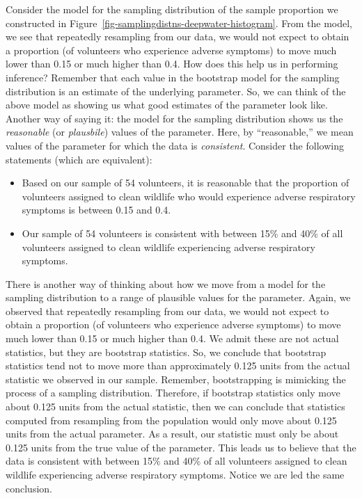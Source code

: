 \documentclass[
  letterpaper,
  DIV=11,
  numbers=noendperiod]{scrreprt}
\providecommand{\tightlist}{%
  \setlength{\itemsep}{0pt}\setlength{\parskip}{0pt}}\usepackage{longtable,booktabs,array}
\theoremstyle{definition}
\theoremstyle{definition}
\theoremstyle{plain}
\theoremstyle{remark}
\begin{document}
Consider the model for the sampling distribution of the sample
proportion we constructed in
Figure~\ref{fig-samplingdistns-deepwater-histogram}. From the model, we
see that repeatedly resampling from our data, we would not expect to
obtain a proportion (of volunteers who experience adverse symptoms) to
move much lower than 0.15 or much higher than 0.4. How does this help us
in performing inference? Remember that each value in the bootstrap model
for the sampling distribution is an estimate of the underlying
parameter. So, we can think of the above model as showing us what good
estimates of the parameter look like. Another way of saying it: the
model for the sampling distribution shows us the \emph{reasonable} (or
\emph{plausbile}) values of the parameter. Here, by ``reasonable,'' we
mean values of the parameter for which the data is \emph{consistent}.
Consider the following statements (which are equivalent):

\begin{itemize}
\tightlist
\item
  Based on our sample of 54 volunteers, it is reasonable that the
  proportion of volunteers assigned to clean wildlife who would
  experience adverse respiratory symptoms is between 0.15 and 0.4.
\item
  Our sample of 54 volunteers is consistent with between 15\% and 40\%
  of all volunteers assigned to clean wildlife experiencing adverse
  respiratory symptoms.
\end{itemize}

There is another way of thinking about how we move from a model for the
sampling distribution to a range of plausible values for the parameter.
Again, we observed that repeatedly resampling from our data, we would
not expect to obtain a proportion (of volunteers who experience adverse
symptoms) to move much lower than 0.15 or much higher than 0.4. We admit
these are not actual statistics, but they are bootstrap statistics. So,
we conclude that bootstrap statistics tend not to move more than
approximately 0.125 units from the actual statistic we observed in our
sample. Remember, bootstrapping is mimicking the process of a sampling
distribution. Therefore, if bootstrap statistics only move about 0.125
units from the actual statistic, then we can conclude that statistics
computed from resampling from the population would only move about 0.125
units from the actual parameter. As a result, our statistic must only be
about 0.125 units from the true value of the parameter. This leads us to
believe that the data is consistent with between 15\% and 40\% of all
volunteers assigned to clean wildlife experiencing adverse respiratory
symptoms. Notice we are led the same conclusion.
\end{document}
